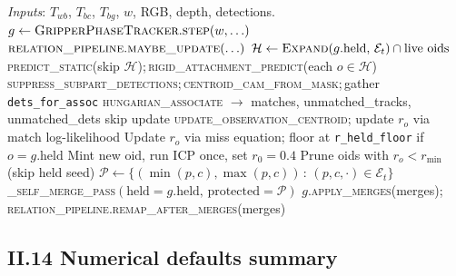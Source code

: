 \documentclass[11pt]{article}
\begin{document}
\begin{algorithm}[H]
\caption{One frame of the Bernoulli-EKF tracker (driver loop).}
\begin{algorithmic}[1]
\State \emph{Inputs}: $T_{wb}$, $T_{bc}$, $T_{bg}$, $w$, RGB, depth, detections.
\State $g \gets \textsc{GripperPhaseTracker}.\textsc{step}(w, \ldots)$
\State $\textsc{relation\_pipeline}.\textsc{maybe\_update}(\ldots)$
\State $\mathcal{H} \gets \textsc{Expand}(g.\text{held},\,\mathcal{E}_t)\cap\text{live oids}$
\State \textsc{predict\_static}(skip $\mathcal{H}$);\,\textsc{rigid\_attachment\_predict}(each $o\in\mathcal{H}$)
\State \textsc{suppress\_subpart\_detections};\,\textsc{centroid\_cam\_from\_mask};\,gather \texttt{dets\_for\_assoc}
\State \textsc{hungarian\_associate} $\to$ matches, unmatched\_tracks, unmatched\_dets
   skip update \EndIf
  \State \textsc{update\_observation\_centroid}; update $r_o$ via match log-likelihood
\EndFor
{}
  \State Update $r_o$ via miss equation; floor at \texttt{r\_held\_floor} if $o = g.\text{held}$
\EndFor
{}
    \State Mint new oid, run ICP once, set $r_0=0.4$
  \EndIf
\EndFor
\State Prune oids with $r_o < r_{\min}$ (skip held seed)
\State $\mathcal{P} \gets \{(\min(p,c),\max(p,c))\,:\,(p,c,\cdot)\in\mathcal{E}_t\}$
\State \textsc{\_self\_merge\_pass}$(\text{held}=g.\text{held},\,\text{protected}=\mathcal{P})$
\State $g$.\textsc{apply\_merges}(merges); \textsc{relation\_pipeline}.\textsc{remap\_after\_merges}(merges)
\end{algorithmic}
\end{algorithm}

\subsection*{II.14 Numerical defaults summary}
\end{document}
